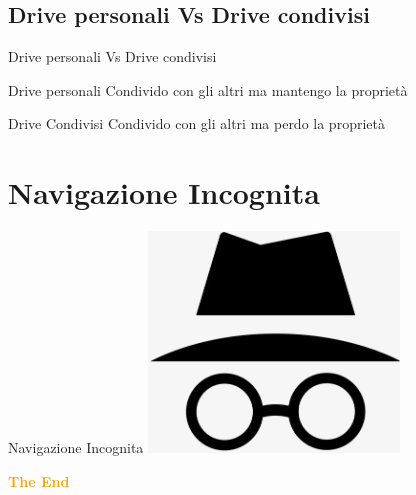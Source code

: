 \documentclass{beamer}
\begin{document}
\subsection{Drive personali Vs Drive condivisi}
\begin{frame}{Drive personali Vs Drive condivisi}
	\begin{alertblock}{Drive personali}
	 Condivido con gli altri ma mantengo la proprietà
	\end{alertblock}
	\begin{block}{Drive Condivisi}
		Condivido con gli altri ma perdo la proprietà
	\end{block}
\end{frame}
\section{Navigazione Incognita}
\begin{frame}{Navigazione Incognita}
\centering
\includegraphics[width=0.50\textwidth]{navinc}
\end{frame}
\begin{frame}[standout]
\centering
\Huge\bfseries
\textcolor{orange}{The End}
\end{frame}
\end{document}
